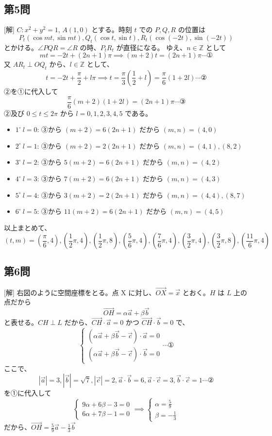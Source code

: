 \documentclass[../main.tex]{subfiles}
\begin{document}
\subsection*{第5問}
[解] $C: x^2+y^2=1$, $A(1, 0)$ とする。時刻 $t$ での $P, Q, R$ の位置は
\[ P_t(\cos mt, \sin mt), Q_t(\cos t, \sin t), R_t(\cos(-2t), \sin(-2t)) \]
とかける。$\angle PQR = \angle R$ の時、$P_t R_t$ が直径になる。
ゆえ、$n \in \mathbb{Z}$ として
\[ mt = -2t + (2n+1)\pi \implies (m+2)t = (2n+1)\pi \cdots \text{①} \]
又 $A R_t \perp O Q_t$ から、$l \in \mathbb{Z}$ として、
\[ t = -2t + \frac{\pi}{2} + l\pi \implies t = \frac{\pi}{3}\left(\frac{1}{2} + l\right) = \frac{\pi}{6}(1+2l) \cdots \text{②} \]
②を①に代入して
\[ \frac{\pi}{6}(m+2)(1+2l) = (2n+1)\pi \cdots \text{③} \]
②及び $0 \le t \le 2\pi$ から $l = 0, 1, 2, 3, 4, 5$ である。
\begin{itemize}
  \item $1^\circ \ l=0$: ③から $(m+2) = 6(2n+1)$ だから $(m, n) = (4, 0)$
  \item $2^\circ \ l=1$: ③から $(m+2) = 2(2n+1)$ だから $(m, n) = (4, 1), (8, 2)$
  \item $3^\circ \ l=2$: ③から $5(m+2) = 6(2n+1)$ だから $(m, n) = (4, 2)$
  \item $4^\circ \ l=3$: ③から $7(m+2) = 6(2n+1)$ だから $(m, n) = (4, 3)$
  \item $5^\circ \ l=4$: ③から $3(m+2) = 2(2n+1)$ だから $(m, n) = (4, 4), (8, 7)$
  \item $6^\circ \ l=5$: ③から $11(m+2) = 6(2n+1)$ だから $(m, n) = (4, 5)$
\end{itemize}
以上まとめて、
\[ (t, m) = \left(\frac{\pi}{6}, 4\right), \left(\frac{1}{2}\pi, 4\right), \left(\frac{1}{2}\pi, 8\right), \left(\frac{5}{6}\pi, 4\right), \left(\frac{7}{6}\pi, 4\right), \left(\frac{3}{2}\pi, 4\right), \left(\frac{3}{2}\pi, 8\right), \left(\frac{11}{6}\pi, 4\right) \]

\subsection*{第6問}
[解] 右図のように空間座標をとる。点 X に対し、$\vec{OX} = \vec{x}$ とおく。$H$ は $L$ 上の点だから
\[ \vec{OH} = \alpha \vec{a} + \beta \vec{b} \]
と表せる。$CH \perp L$ だから、$\vec{CH} \cdot \vec{a} = 0$ かつ $\vec{CH} \cdot \vec{b} = 0$ で、
\[
  \begin{cases} (\alpha \vec{a} + \beta \vec{b} - \vec{c}) \cdot \vec{a} = 0 \\ (\alpha \vec{a} + \beta \vec{b} - \vec{c}) \cdot \vec{b} = 0
\end{cases} \cdots \text{①} \]
ここで、
\[ |\vec{a}| = 3, |\vec{b}| = \sqrt{7}, |\vec{c}| = 2, \vec{a}\cdot\vec{b} = 6, \vec{a}\cdot\vec{c} = 3, \vec{b}\cdot\vec{c} = 1 \cdots \text{②} \]
を①に代入して
\[
  \begin{cases} 9\alpha + 6\beta - 3 = 0 \\ 6\alpha + 7\beta - 1 = 0
  \end{cases} \implies
  \begin{cases} \alpha = \frac{5}{9} \\ \beta = -\frac{1}{3}
\end{cases} \]
だから、$\vec{OH} = \frac{5}{9}\vec{a} - \frac{1}{3}\vec{b}$
\end{document}
